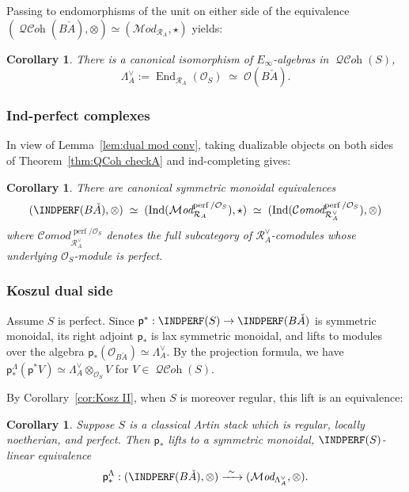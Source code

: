 \documentclass[12pt, oneside]{amsart}
\numberwithin{equation}{section}
\newtheorem{corollary}[subsubsection]{Corollary}
\theoremstyle{remark}
\theoremstyle{plain}
\newcommand{\MOD}{\mathcal{M}\textit{od}}
\newcommand{\COMOD}{\mathcal{C}\textit{omod}}
\DeclareMathOperator{\QCOH}{\mathcal{QC}\textit{oh}}
\newcommand{\R}{\mathcal{R}}
\newcommand{\RA}{\R_A}
\newcommand{\lamco}{\Lambda^\vee}
\newcommand{\OO}{\mathcal{O}}
\newcommand{\Ind}{\operatorname{Ind}}
\newcommand{\sfp}{\mathsf{p}}
\begin{document}
Passing to endomorphisms of the unit on either side of the equivalence $(\QCOH(B\check{A}), \otimes) \simeq (\MOD_{\RA}, \star)$ yields:

\begin{corollary}\label{cor:O B checkA via End}
  There is a canonical isomorphism of $E_\infty$-algebras in $\QCOH(S)$,
  \[
    \lamco_A := \operatorname{End}_{\RA}(\OO_S) \;\simeq\; \OO(B\check{A}).
  \]
\end{corollary}

\subsubsection{Ind-perfect complexes}

In view of Lemma~\ref{lem:dual mod conv}, taking dualizable objects on both sides of Theorem~\ref{thm:QCoh checkA} and ind-completing gives:

\begin{corollary}\label{cor:IndPerf checkA}
  There are canonical symmetric monoidal equivalences
  \begin{equation*}
    (\INDPERF(B\check{A}), \otimes)
      \;\simeq\; (\Ind(\MOD^{\operatorname{perf}/\OO_S}_{\RA}), \star)
    \;\simeq\; (\Ind(\COMOD^{\operatorname{perf}/\OO_S}_{\RA^\vee}), \otimes)
  \end{equation*}
  where $\COMOD^{\operatorname{perf}/\OO_S}_{\RA^\vee}$ denotes the full subcategory of $\RA^\vee$-comodules whose underlying $\OO_S$-module is perfect.
\end{corollary}

\subsubsection{Koszul dual side}

Assume $S$ is perfect.
Since $\sfp^* : \INDPERF(S) \to \INDPERF(B\check{A})$ is symmetric monoidal, its right adjoint $\sfp_*$ is lax symmetric monoidal, and lifts to modules over the algebra $\sfp_*(\OO_{B\check{A}}) \simeq \lamco_A$.
By the projection formula, we have $\sfp_*^{\Lambda}(\sfp^* V) \simeq \lamco_A \otimes_{\OO_S} V$ for $V \in \QCOH(S)$.

By Corollary~\ref{cor:Kosz II}, when $S$ is moreover regular, this lift is an equivalence:

\begin{corollary}\label{cor:IndPerf BcheckA Kosz}
  Suppose $S$ is a classical Artin stack which is regular, locally noetherian, and perfect.
  Then $\sfp_*$ lifts to a symmetric monoidal, $\INDPERF(S)$-linear equivalence
  \[
    \sfp_*^{\Lambda} : (\INDPERF(B\check{A}), \otimes) \xrightarrow{\ \sim\ } (\MOD_{\lamco_A}, \otimes).
  \]
\end{corollary}
\end{document}
